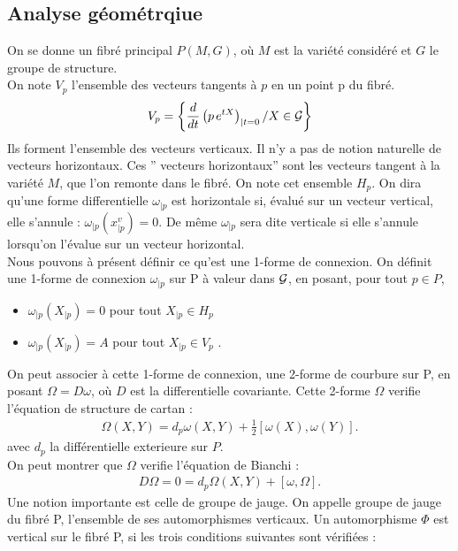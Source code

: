 \documentclass[a4paper,11pt]{article} %
\theoremstyle{plain}
\theoremstyle{definition}
\theoremstyle{remark}
\numberwithin{equation}{section}
\numberwithin{equation}{subsection}
\numberwithin{figure}{section}
\begin{document}
  \subsection{Analyse géométrqiue}

\noindent
On se donne un fibré principal $P(M,G)$, où $M$ est la variété considéré et $G$ le groupe de structure.\\
On note $V_{p}$ l'ensemble des vecteurs tangents à $p$ en un point p du fibré.
\begin{eqnarray*}
 V_{p} = \left \{  \frac{d}{dt} \left( p\hspace{0.5mm} e^{tX} \right)_{|t=0} / X \in \cal{G}  \right \}
\end{eqnarray*}
Ils forment l'ensemble des vecteurs verticaux. Il n'y a pas de notion naturelle de vecteurs horizontaux. Ces '' vecteurs horizontaux'' sont les vecteurs tangent à la variété $M$, que l'on remonte dans le fibré. On note cet ensemble $H_{p}$. On dira qu'une forme differentielle $\omega_{|p}$ est horizontale si, évalué sur un vecteur vertical, elle s'annule : $\omega_ {|p} (x^{v}_{|p}) = 0$. De même $\omega_{|p}$ sera dite verticale si elle s'annule lorsqu'on l'évalue sur un vecteur horizontal.\\
Nous pouvons à présent définir ce qu'est une 1-forme de connexion. On définit une 1-forme de connexion $\omega_{|p}$ sur P à valeur dans $\cal{G}$, en posant, pour tout $p \in P$,
\begin{itemize}
 \item $\omega_{|p} (X_{|p}) = 0$ pour tout $X_{|p} \in H_{p}$
 \item $\omega_{|p} (X_{|p}) = A$ pour tout $X_{|p} \in V_{p}$ .
\end{itemize}
On peut associer à cette 1-forme de connexion, une 2-forme de courbure sur P, en posant $\Omega = D \omega$, où $D$ est la differentielle covariante. 
Cette 2-forme $\Omega$ verifie l'équation de structure de cartan :
\begin{eqnarray*}
 \Omega (X,Y) = d_{p} \omega (X,Y) + \frac{1}{2} \left [ \omega (X) , \omega (Y) \right ].
\end{eqnarray*}
avec $d_{p}$ la différentielle exterieure sur $P$. \\
On peut montrer que $\Omega$ verifie l'équation de Bianchi :
\begin{eqnarray*}
 D \Omega = 0 = d_{p} \Omega (X,Y) +  \left [ \omega  , \Omega  \right ].
\end{eqnarray*}
Une notion importante est celle de groupe de jauge. On appelle groupe de jauge du fibré P, l'ensemble de ses automorphismes verticaux. Un automorphisme $\Phi$ est vertical sur le fibré P, si les trois conditions suivantes sont vérifiées :
\end{document}
